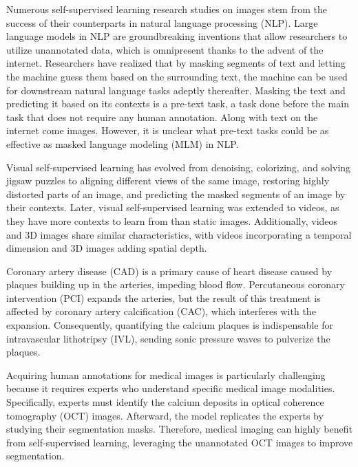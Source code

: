 \documentclass[a4paper,11pt,oneside]{report}
\begin{document}

Numerous self-supervised learning research studies on images stem from the success of their counterparts in natural language processing (NLP). Large language models in NLP are groundbreaking inventions that allow researchers to utilize unannotated data, which is omnipresent thanks to the advent of the internet. Researchers have realized that by masking segments of text and letting the machine guess them based on the surrounding text, the machine can be used for downstream natural language tasks adeptly thereafter. Masking the text and predicting it based on its contexts is a pre-text task, a task done before the main task that does not require any human annotation. Along with text on the internet come images. However, it is unclear what pre-text tasks could be as effective as masked language modeling (MLM) in NLP. 

Visual self-supervised learning has evolved from denoising, colorizing, and solving jigsaw puzzles to aligning different views of the same image, restoring highly distorted parts of an image, and predicting the masked segments of an image by their contexts. Later, visual self-supervised learning was extended to videos, as they have more contexts to learn from than static images. Additionally, videos and 3D images share similar characteristics, with videos incorporating a temporal dimension and 3D images adding spatial depth.

Coronary artery disease (CAD) is a primary cause of heart disease caused by plaques building up in the arteries, impeding blood flow. Percutaneous coronary intervention (PCI) expands the arteries, but the result of this treatment is affected by coronary artery calcification (CAC), which interferes with the expansion. Consequently, quantifying the calcium plaques is indispensable for intravascular lithotripsy (IVL), sending sonic pressure waves to pulverize the plaques.

Acquiring human annotations for medical images is particularly challenging because it requires experts who understand specific medical image modalities. Specifically, experts must identify the calcium deposits in optical coherence tomography (OCT) images. Afterward, the model replicates the experts by studying their segmentation masks. Therefore, medical imaging can highly benefit from self-supervised learning, leveraging the unannotated OCT images to improve segmentation.
\end{document}
